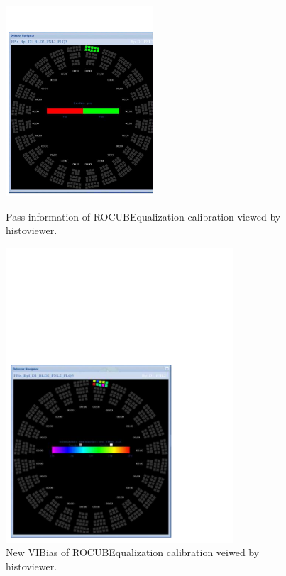 \begin{figure}
\begin{minipage}[b]{0.47\linewidth} %
\centering
\includegraphics[width=5.5cm]{ROCUB_pass.pdf}
\caption{Pass information of ROCUBEqualization calibration viewed by histoviewer.}
\label{passinfo}
\end{minipage}
\hspace{0.5cm}
\begin{minipage}[b]{0.47\linewidth}
\centering
\includegraphics[width=8.5cm]{ROCUB_new_histoviewer.pdf}
\caption{New VIBias of ROCUBEqualization calibration veiwed by histoviewer.}
\label{summaryinfo}
\end{minipage}
\end{figure}


